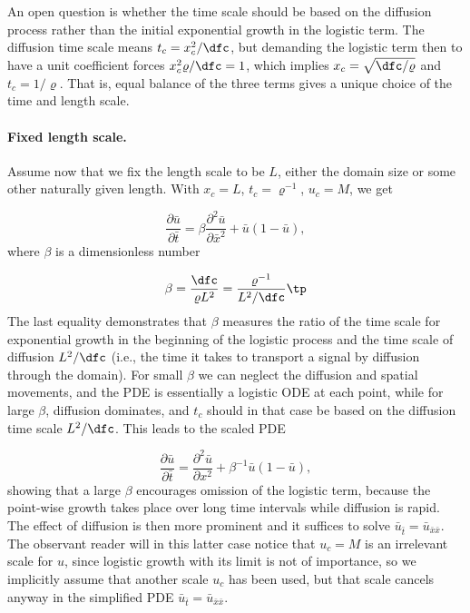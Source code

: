 \documentclass[graybox,envcountchap,sectrefs,final]{svmonodo}
\begin{document}
An open question is whether the time scale should be based on
the diffusion process rather than the initial exponential growth
in the logistic term. The diffusion time scale means $t_c = x_c^2/\dfc$,
but demanding the logistic term then to have a unit coefficient
forces $x_c^2\varrho /\dfc = 1$, which implies $x_c=\sqrt{\dfc/\varrho}$
and $t_c=1/\varrho$. That is, equal balance of the three
terms gives a unique choice of the time and length scale.

\paragraph{Fixed length scale.}
Assume now that we fix the length scale to be $L$, either the
domain size or some other naturally given length. With
$x_c=L$, $t_c=\varrho^{-1}$,
$u_c=M$, we get

\begin{equation}
\frac{\partial \bar u}{\partial \bar t} =
\beta
\frac{\partial^2 \bar u}{\partial\bar x^2} + \bar u (1 - \bar u),
\end{equation}
where $\beta$ is a dimensionless number

\[ \beta = \frac{\dfc}{\varrho L^2} = \frac{\varrho^{-1}}{L^2/\dfc}\tp\]
The last equality demonstrates
that $\beta$ measures the ratio of the time scale
for exponential growth in the beginning of the logistic process
and the time scale of diffusion $L^2/\dfc$ (i.e., the time it takes
to transport a signal by diffusion through the domain).
For small $\beta$ we can neglect the diffusion and spatial movements,
and the PDE is essentially a logistic ODE at each point, while for
large $\beta$, diffusion dominates, and $t_c$ should in that case be
based on the diffusion time scale $L^2/\dfc$. This leads to the
scaled PDE

\begin{equation}
\frac{\partial \bar u}{\partial \bar t} =
\frac{\partial^2 \bar u}{\partial x^2} + \beta^{-1}\bar u (1 - \bar u),
\end{equation}
showing that a large $\beta$ encourages omission of the logistic term,
because the point-wise growth takes place over long time intervals while
diffusion is rapid. The effect of diffusion is then more prominent
and it suffices to solve $\bar u_{\bar t} = \bar u_{\bar x\bar x}$.
The observant reader will in this latter case notice that $u_c=M$
is an irrelevant scale for $u$, since logistic growth with its limit is
not of importance, so we implicitly assume that another scale $u_c$
has been used, but that scale cancels anyway in the simplified PDE
$\bar u_{\bar t} = \bar u_{\bar x\bar x}$.
\end{document}
